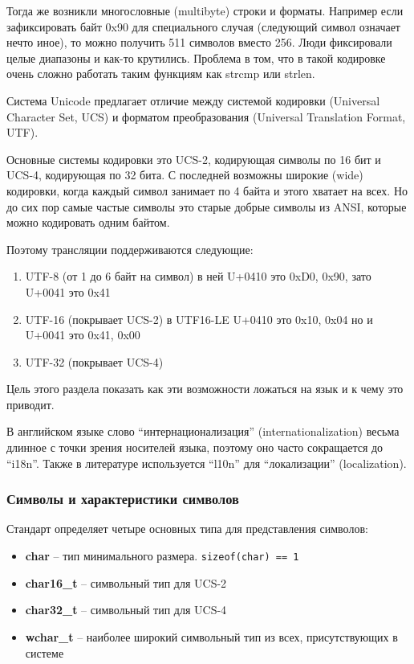 \documentclass[a4paper,12pt,oneside]{article}
\begin{document}
Тогда же возникли многословные (multibyte) строки и форматы. Например если зафиксировать байт 0x90 для специального случая (следующий символ означает нечто иное), то можно получить 511 символов вместо 256. Люди фиксировали целые диапазоны и как-то крутились. Проблема в том, что в такой кодировке очень сложно работать таким функциям как strcmp или strlen.

Система Unicode предлагает отличие между системой кодировки (Universal Character Set, UCS) и форматом преобразования (Universal Translation Format, UTF). 

Основные системы кодировки это UCS-2, кодирующая символы по 16 бит и UCS-4, кодирующая по 32 бита. С последней возможны широкие (wide) кодировки, когда каждый символ занимает по 4 байта и этого хватает на всех. Но до сих пор самые частые символы это старые добрые символы из ANSI, которые можно кодировать одним байтом.

Поэтому трансляции поддерживаются следующие:

\begin{enumerate}
\item UTF-8 (от 1 до 6 байт на символ) в ней U+0410 это {0xD0, 0x90}, зато U+0041 это {0x41}
\item UTF-16 (покрывает UCS-2) в UTF16-LE U+0410 это {0x10, 0x04} но и U+0041 это {0x41, 0x00}
\item UTF-32 (покрывает UCS-4)
\end{enumerate}

Цель этого раздела показать как эти возможности ложаться на язык и к чему это приводит.

В английском языке слово ``интернационализация'' (internationalization) весьма длинное с точки зрения носителей языка, поэтому оно часто сокращается до ``i18n''. Также в литературе используется ``l10n'' для ``локализации'' (localization).

\subsubsection{Символы и характеристики символов}

Стандарт определяет четыре основных типа для представления символов:

\begin{itemize}
\item \textbf{char} -- тип минимального размера. \lstinline!sizeof(char) == 1!
\item \textbf{char16\_t} -- символьный тип для UCS-2
\item \textbf{char32\_t} -- символьный тип для UCS-4
\item \textbf{wchar\_t} -- наиболее широкий символьный тип из всех, присутствующих в системе
\end{itemize}
\end{document}
